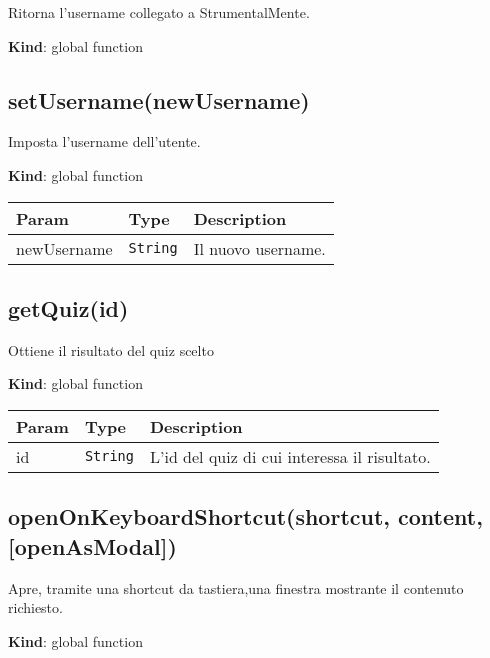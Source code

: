 Ritorna l'username collegato a StrumentalMente.

\textbf{Kind}: global function\\
\protect\hypertarget{setUsername}{}{}

\hypertarget{setusernamenewusername}{%
\subsection{setUsername(newUsername)}\label{setusernamenewusername}}

Imposta l'username dell'utente.

\textbf{Kind}: global function

\begin{tabularx}{\textwidth}{XXX}
\toprule
Param & Type & Description\tabularnewline
\midrule
\endhead
newUsername & \texttt{String} & Il nuovo username.\tabularnewline
\bottomrule
\end{tabularx}

\protect\hypertarget{getQuiz}{}{}

\hypertarget{getquizid}{%
\subsection{getQuiz(id)}\label{getquizid}}

Ottiene il risultato del quiz scelto

\textbf{Kind}: global function

\begin{tabularx}{\textwidth}{XXX}
\toprule
Param & Type & Description\tabularnewline
\midrule
\endhead
id & \texttt{String} & L'id del quiz di cui interessa il
risultato.\tabularnewline
\bottomrule
\end{tabularx}

\protect\hypertarget{openOnKeyboardShortcut}{}{}

\hypertarget{openonkeyboardshortcutshortcut-content-openasmodal}{%
\subsection{openOnKeyboardShortcut(shortcut, content,
{[}openAsModal{]})}\label{openonkeyboardshortcutshortcut-content-openasmodal}}

Apre, tramite una shortcut da tastiera,una finestra mostrante il
contenuto richiesto.

\textbf{Kind}: global function

